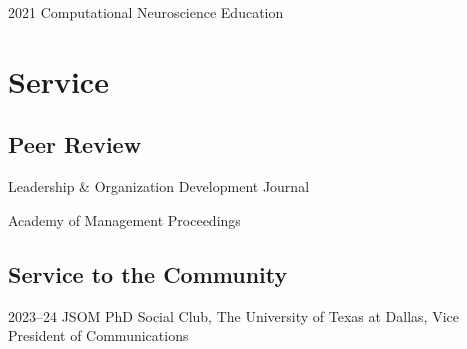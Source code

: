 \documentclass[12pt,letterpaper]{report} %
\newcommand{\listitemspace}{0em}
\renewenvironment{itemize}
{\begin{list}{}{\setlength{\leftmargin}{0em}
                \setlength{\parskip}{0em}
                \setlength{\itemsep}{\listitemspace}
                \setlength{\parsep}{\listitemspace}}}
{\end{list}}
\begin{document}
    \begin{tablist}
        \item[2021]\tab{}Computational Neuroscience Education
        
    \end{tablist}
    \section*{Service}


    \subsection*{Peer Review}

    \begin{itemize}

        \item Leadership \& Organization Development Journal
        
        \item Academy of Management Proceedings
        
    \end{itemize}


   \subsection*{Service to the Community}

   \begin{tablist}

       \item[2023--24]\tab{}JSOM PhD Social Club, The University of Texas at Dallas, Vice President of Communications

   \end{tablist}



\end{document}
